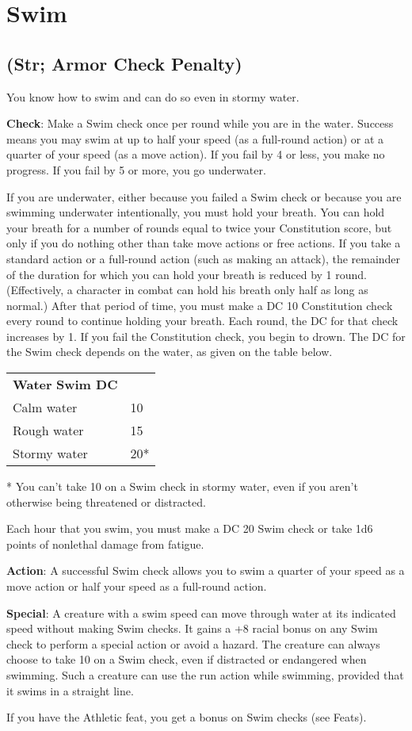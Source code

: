 \section{Swim}

\label{f0}
\subsection{(Str; Armor Check Penalty)}

				
You know how to swim and can do so even in stormy water.
				
\textbf{Check}: Make a Swim check once per round while you are in the water. Success means you may swim at up to half your speed (as a full-round action) or at a quarter of your speed (as a move action). If you fail by 4 or less, you make no progress. If you fail by 5 or more, you go underwater.
				
If you are underwater, either because you failed a Swim check or because you are swimming underwater intentionally, you must hold your breath. You can hold your breath for a number of rounds equal to twice your Constitution score, but only if you do nothing other than take move actions or free actions. If you take a standard action or a full-round action (such as making an attack), the remainder of the duration for which you can hold your breath is reduced by 1 round. (Effectively, a character in combat can hold his breath only half as long as normal.) After that period of time, you must make a DC 10 Constitution check every round to continue holding your breath. Each round, the DC for that check increases by 1. If you fail the Constitution check, you begin to drown. The DC for the Swim check depends on the water, as given on the table below.
\begin{table}
 \sffamily
 \begin{tabular}{ll}
\textbf{Water} \textbf{Swim DC}\\
Calm water & 10\\
Rough water & 15\\
Stormy water & 20*\\
 \end{tabular}
* You can't take 10 on a Swim check in stormy water, even if you aren't otherwise being threatened or distracted.
\end{table}
				
Each hour that you swim, you must make a DC 20 Swim check or take 1d6 points of nonlethal damage from fatigue.
				
\textbf{Action}: A successful Swim check allows you to swim a quarter of your speed as a move action or half your speed as a full-round action.
				
\textbf{Special}: A creature with a swim speed can move through water at its indicated speed without making Swim checks. It gains a +8 racial bonus on any Swim check to perform a special action or avoid a hazard. The creature can always choose to take 10 on a Swim check, even if distracted or endangered when swimming. Such a creature can use the run action while swimming, provided that it swims in a straight line.
				
If you have the Athletic feat, you get a bonus on Swim checks (see Feats).
